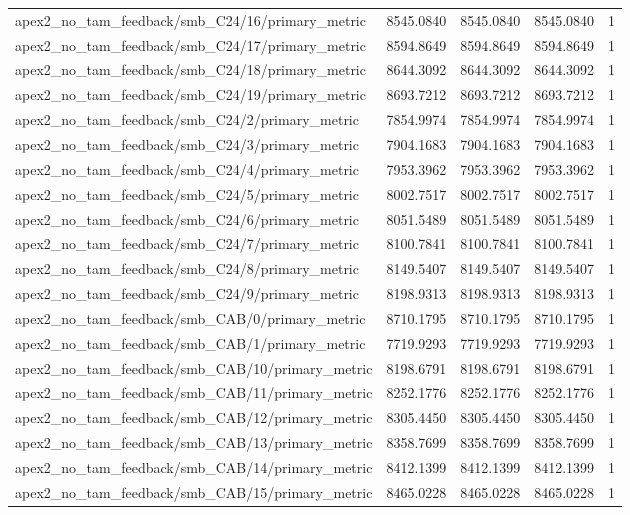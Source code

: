 \begin{table}[h]
\begin{tabular}{lrrrr}
apex2_no_tam_feedback/smb_C24/16/primary_metric & 8545.0840 & 8545.0840 & 8545.0840 & 1 \\
apex2_no_tam_feedback/smb_C24/17/primary_metric & 8594.8649 & 8594.8649 & 8594.8649 & 1 \\
apex2_no_tam_feedback/smb_C24/18/primary_metric & 8644.3092 & 8644.3092 & 8644.3092 & 1 \\
apex2_no_tam_feedback/smb_C24/19/primary_metric & 8693.7212 & 8693.7212 & 8693.7212 & 1 \\
apex2_no_tam_feedback/smb_C24/2/primary_metric & 7854.9974 & 7854.9974 & 7854.9974 & 1 \\
apex2_no_tam_feedback/smb_C24/3/primary_metric & 7904.1683 & 7904.1683 & 7904.1683 & 1 \\
apex2_no_tam_feedback/smb_C24/4/primary_metric & 7953.3962 & 7953.3962 & 7953.3962 & 1 \\
apex2_no_tam_feedback/smb_C24/5/primary_metric & 8002.7517 & 8002.7517 & 8002.7517 & 1 \\
apex2_no_tam_feedback/smb_C24/6/primary_metric & 8051.5489 & 8051.5489 & 8051.5489 & 1 \\
apex2_no_tam_feedback/smb_C24/7/primary_metric & 8100.7841 & 8100.7841 & 8100.7841 & 1 \\
apex2_no_tam_feedback/smb_C24/8/primary_metric & 8149.5407 & 8149.5407 & 8149.5407 & 1 \\
apex2_no_tam_feedback/smb_C24/9/primary_metric & 8198.9313 & 8198.9313 & 8198.9313 & 1 \\
apex2_no_tam_feedback/smb_CAB/0/primary_metric & 8710.1795 & 8710.1795 & 8710.1795 & 1 \\
apex2_no_tam_feedback/smb_CAB/1/primary_metric & 7719.9293 & 7719.9293 & 7719.9293 & 1 \\
apex2_no_tam_feedback/smb_CAB/10/primary_metric & 8198.6791 & 8198.6791 & 8198.6791 & 1 \\
apex2_no_tam_feedback/smb_CAB/11/primary_metric & 8252.1776 & 8252.1776 & 8252.1776 & 1 \\
apex2_no_tam_feedback/smb_CAB/12/primary_metric & 8305.4450 & 8305.4450 & 8305.4450 & 1 \\
apex2_no_tam_feedback/smb_CAB/13/primary_metric & 8358.7699 & 8358.7699 & 8358.7699 & 1 \\
apex2_no_tam_feedback/smb_CAB/14/primary_metric & 8412.1399 & 8412.1399 & 8412.1399 & 1 \\
apex2_no_tam_feedback/smb_CAB/15/primary_metric & 8465.0228 & 8465.0228 & 8465.0228 & 1 \\

\end{tabular}
\end{table}
